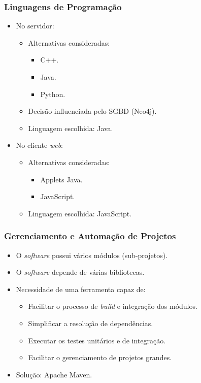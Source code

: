 \frame
{
\frametitle{Linguagens de Programação}
\begin{itemize}
	\item No servidor:
	\begin{itemize}
		\item Alternativas consideradas:
		\begin{itemize}
			\item C++.
			\item Java.
			\item Python.
		\end{itemize}
		\item Decisão influenciada pelo SGBD (Neo4j).
		\item Linguagem escolhida: Java.
	\end{itemize}
	\item No cliente \emph{web}:
	\begin{itemize}
		\item Alternativas consideradas:
		\begin{itemize}
			\item Applets Java.
			\item JavaScript.
		\end{itemize}
		\item Linguagem escolhida: JavaScript.
	\end{itemize}
\end{itemize}
}

\frame
{
\frametitle{Gerenciamento e Automação de Projetos}
	\begin{itemize}
		\item O \emph{software} possui vários módulos (sub-projetos).
		\item O \emph{software} depende de várias bibliotecas.
		\item Necessidade de uma ferramenta capaz de:
		\begin{itemize}
			\item Facilitar o processo de \emph{build} e integração dos módulos.
			\item Simplificar a resolução de dependências.
			\item Executar os testes unitários e de integração.
			\item Facilitar o gerenciamento de projetos grandes.
		\end{itemize}
		\item Solução: Apache Maven.
	\end{itemize}
}

